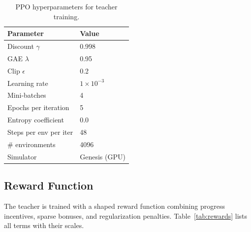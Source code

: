 \documentclass[10pt,twocolumn]{article}
\begin{document}
\begin{table}[h]
  \centering
  \caption{PPO hyperparameters for teacher training.}
  \label{tab:ppo_hypers}
  \small
  \begin{tabular}{@{}ll@{}}
    \toprule
    Parameter & Value \\
    \midrule
    Discount $\gamma$ & 0.998 \\
    GAE $\lambda$ & 0.95 \\
    Clip $\epsilon$ & 0.2 \\
    Learning rate & $1 \times 10^{-3}$ \\
    Mini-batches & 4 \\
    Epochs per iteration & 5 \\
    Entropy coefficient & 0.0 \\
    Steps per env per iter & 48 \\
    \# environments & 4096 \\
    Simulator & Genesis (GPU) \\
    \bottomrule
  \end{tabular}
\end{table}

\subsection{Reward Function}

The teacher is trained with a shaped reward function combining
progress incentives, sparse bonuses, and regularization penalties.
Table~\ref{tab:rewards} lists all terms with their scales.
\end{document}
